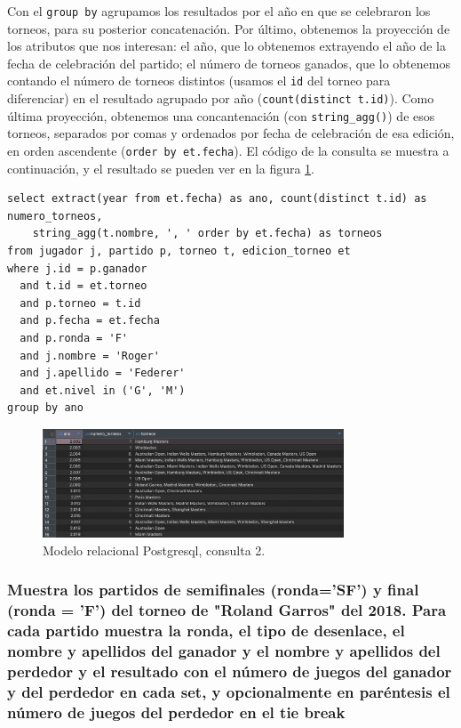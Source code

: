 \documentclass[11pt]{opticajnl}
\begin{document}
Con el \texttt{group by} agrupamos los resultados por el año en que se celebraron los torneos, para su posterior concatenación. Por último, obtenemos la proyección de los atributos que nos interesan: el año, que lo obtenemos extrayendo el año de la fecha de celebración del partido; el número de torneos ganados, que lo obtenemos contando el número de torneos distintos (usamos el \texttt{id} del torneo para diferenciar) en el resultado agrupado por año (\texttt{count(distinct t.id)}). Como última proyección, obtenemos una concantenación (con \texttt{string\_agg()}) de esos torneos, separados por comas y ordenados por fecha de celebración de esa edición, en orden ascendente (\texttt{order by et.fecha}). El código de la consulta se muestra a continuación, y el resultado se pueden ver en la figura \ref{fig:q2_rel}.

\begin{verbatim}
select extract(year from et.fecha) as ano, count(distinct t.id) as numero_torneos, 
	string_agg(t.nombre, ', ' order by et.fecha) as torneos
from jugador j, partido p, torneo t, edicion_torneo et
where j.id = p.ganador
  and t.id = et.torneo
  and p.torneo = t.id
  and p.fecha = et.fecha
  and p.ronda = 'F'
  and j.nombre = 'Roger'
  and j.apellido = 'Federer'
  and et.nivel in ('G', 'M')
group by ano
\end{verbatim}

\begin{figure}[H]
\centering
\includegraphics[width=0.8\textwidth]{fotos/q2_rel.png}
\caption{Modelo relacional Postgresql, consulta 2.}
\label{fig:q2_rel}
\end{figure}


\subsubsection{Muestra los partidos de semiﬁnales (ronda='SF') y ﬁnal (ronda = 'F') del torneo de "Roland Garros" del 2018. Para cada partido muestra la ronda, el tipo de desenlace, el nombre y apellidos del ganador y el nombre y apellidos del perdedor y el resultado con el número de juegos del ganador y del perdedor en cada set, y opcionalmente en paréntesis el número de juegos del perdedor en el tie break}
\end{document}
